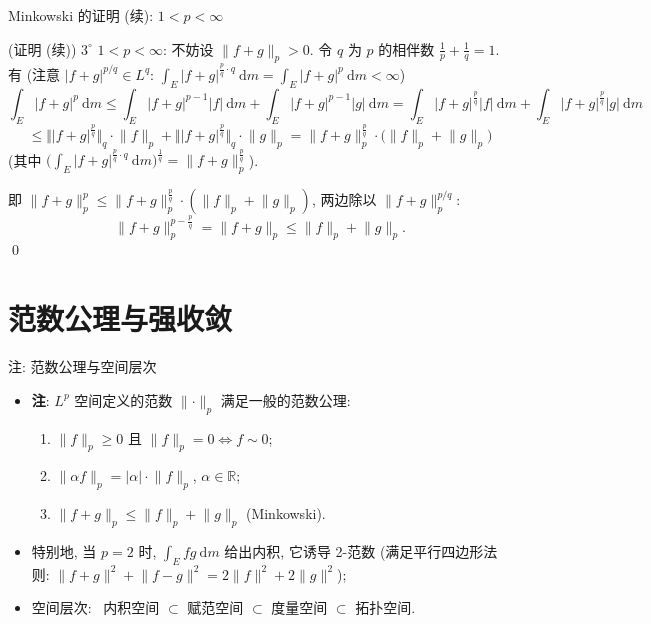 \begin{frame}{Minkowski 的证明 (续): $1 < p < \infty$}

\startproof[bg=yellow, fg=red](证明 (续))
$3^{\circ}$ $1 < p < \infty$: 不妨设 $\lVert f+g \rVert_p > 0$.
令 $q$ 为 $p$ 的相伴数 $\frac1p + \frac1q = 1$. 有
(注意 $|f+g|^{p/q} \in L^q$: $\int_E |f+g|^{\frac{p}{q} \cdot q} ~ \mathrm{d} m = \int_E |f+g|^p ~ \mathrm{d} m < \infty$)
\[
\int_E |f+g|^p ~ \mathrm{d} m
\leqslant \int_E |f+g|^{p-1} |f| ~ \mathrm{d} m
+ \int_E |f+g|^{p-1} |g| ~ \mathrm{d} m
= \int_E |f+g|^{\frac{p}{q}} |f| ~ \mathrm{d} m
+ \int_E |f+g|^{\frac{p}{q}} |g| ~ \mathrm{d} m
\]
\[
\leqslant \big\Vert |f+g|^{\frac{p}{q}} \big\Vert_q \cdot \lVert f \rVert_p
+ \big\Vert |f+g|^{\frac{p}{q}} \big\Vert_q \cdot \lVert g \rVert_p
= \lVert f+g \rVert_p^{\frac{p}{q}} \cdot \big( \lVert f \rVert_p + \lVert g \rVert_p \big)
\]
(其中 $\big( \int_E |f+g|^{\frac{p}{q} \cdot q} ~ \mathrm{d} m \big)^{\frac1q}
= \lVert f+g \rVert_p^{\frac{p}{q}}$).

\pause

即 $\lVert f+g \rVert_p^p \leqslant \lVert f+g \rVert_p^{\frac{p}{q}} \cdot
(\lVert f \rVert_p + \lVert g \rVert_p)$, 两边除以 $\lVert f+g \rVert_p^{p/q}$:
\[
\lVert f+g \rVert_p^{p - \frac{p}{q}} = \lVert f+g \rVert_p
\leqslant \lVert f \rVert_p + \lVert g \rVert_p .
\]
\qed

\end{frame}


\section[强收敛]{范数公理与强收敛}


\begin{frame}{注: 范数公理与空间层次}

\begin{itemize}
\item \textbf{注}: $L^p$ 空间定义的范数 $\lVert \cdot \rVert_p$ 满足一般的范数公理:
  \begin{enumerate}
  \item $\lVert f \rVert_p \geqslant 0$ 且 $\lVert f \rVert_p = 0 \Longleftrightarrow f \sim 0$;
  \item $\lVert \alpha f \rVert_p = |\alpha| \cdot \lVert f \rVert_p$, $\alpha \in \mathbb{R}$;
  \item $\lVert f + g \rVert_p \leqslant \lVert f \rVert_p + \lVert g \rVert_p$ (Minkowski).
  \end{enumerate}
\item 特别地, 当 $p = 2$ 时, $\int_E f g ~ \mathrm{d} m$ 给出\alert{内积},
  它诱导 2-范数 (满足平行四边形法则:
  $\lVert f+g \rVert^2 + \lVert f-g \rVert^2 = 2\lVert f \rVert^2 + 2\lVert g \rVert^2$);
\item 空间层次: \ 内积空间 $\subset$ 赋范空间 $\subset$ 度量空间 $\subset$ 拓扑空间.
\end{itemize}

\end{frame}

